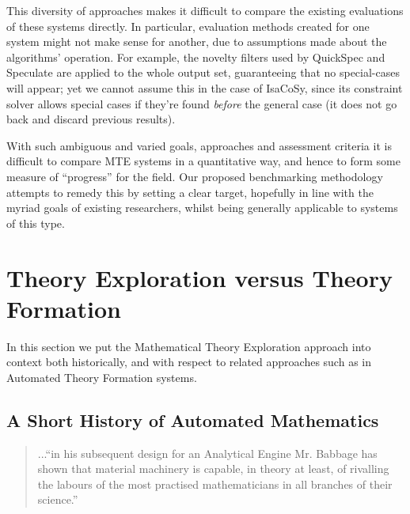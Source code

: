 This diversity of approaches makes it difficult to compare the existing
evaluations of these systems directly. In particular, evaluation methods created
for one system might not make sense for another, due to assumptions made about
the algorithms' operation. For example, the novelty filters used by QuickSpec
and Speculate are applied to the whole output set, guaranteeing that no
special-cases will appear; yet we cannot assume this in the case of IsaCoSy,
since its constraint solver allows special cases if they're found \emph{before}
the general case (it does not go back and discard previous results).

With such ambiguous and varied goals, approaches and assessment criteria it is
difficult to compare MTE systems in a quantitative way, and hence to form some
measure of ``progress'' for the field. Our proposed benchmarking methodology
attempts to remedy this by setting a clear target, hopefully in line with the
myriad goals of existing researchers, whilst being generally applicable to
systems of this type.

\section{Theory Exploration versus Theory
  Formation}\label{exploration-versus-formation}

In this section we put the Mathematical Theory Exploration approach
into context both historically, and with respect to related approaches
such as in Automated Theory Formation systems.

\subsection{A Short History of Automated Mathematics}

\begin{quote}
...``in his subsequent design for an Analytical Engine Mr. Babbage has
shown that material machinery is capable, in theory at least, of
rivalling the labours of the most practised mathematicians in all
branches of their science.''~\cite[p. 498]{jevons}
\end{quote}

